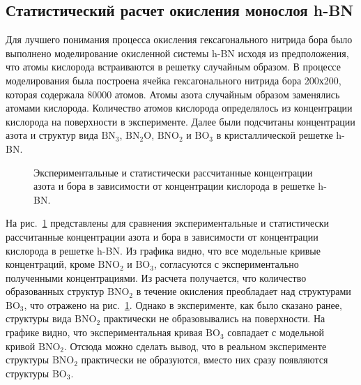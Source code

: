 \subsection{Статистический расчет окисления монослоя h-BN}
Для лучшего понимания процесса окисления гексагонального нитрида бора было выполнено моделирование окисленной системы 
h-BN исходя из предположения, что атомы кислорода встраиваются в решетку случайным образом. В процессе моделирования
была построена ячейка гексагонального нитрида бора 200х200, которая содержала 80000 атомов. Атомы азота случайным образом 
заменялись атомами кислорода. Количество атомов кислорода определялось из концентрации кислорода на поверхности в эксперименте. 
Далее были подсчитаны концентрации азота и структур вида $\mathrm{BN_3}$, $\mathrm{BN_2O}$, $\mathrm{BNO_2}$ и $\mathrm{BO_3}$ в 
кристаллической решетке  h-BN.
\begin{figure}[!ht]
\caption{Экспериментальные и статистически рассчитанные концентрации азота и бора в зависимости от концентрации кислорода 
в решетке h-BN.}
\label{pic:BN_200x200_experiment_and_model}
\end{figure}
На рис.~\ref{pic:BN_200x200_experiment_and_model} представлены для сравнения экспериментальные и статистически 
рассчитанные концентрации азота и бора в зависимости от концентрации кислорода в решетке h-BN. Из графика видно,
что все модельные кривые концентраций, кроме $\mathrm{BNO_2}$ и $\mathrm{BO_3}$, согласуются с экспериментально полученными 
концентрациями. Из расчета получается, что количество образованных структур  $\mathrm{BNO_2}$ в течение окисления
преобладает над структурами $\mathrm{BO_3}$, что отражено на рис.~\ref{pic:BN_200x200_experiment_and_model}. Однако
в эксперименте, как было сказано ранее, структуры вида $\mathrm{BNO_2}$ практически не образовывались на поверхности.
На графике видно, что экспериментальная кривая $\mathrm{BO_3}$ совпадает с модельной кривой $\mathrm{BNO_2}$. Отсюда
можно сделать вывод, что в реальном эксперименте структуры $\mathrm{BNO_2}$ практически не образуются, вместо них
сразу появляются структуры $\mathrm{BO_3}$. 

